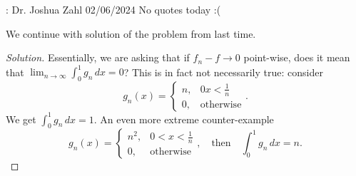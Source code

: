 \begin{nquote}{: Dr. Joshua Zahl 02/06/2024}
	No quotes today :(
\end{nquote}

We continue with solution of the problem from last time. 
\begin{proof}[Solution]
	Essentially, we are asking that if \(f_n-f\to 0\) point-wise, does it mean that \(\displaystyle\lim_{n\to\infty}\int_0^1 g_n \, dx=0\)? This is in fact not necessarily true: consider 
	\begin{equation*}
		g_n(x)=\begin{cases}
				n,&0x<\frac{1}{n}\\
				0,&\text{otherwise}
			   \end{cases}.
	\end{equation*}
	We get \(\displaystyle\int_0^1 g_n \, dx=1\). An even more extreme counter-example 
	\begin{equation*}
		g_n(x)=\begin{cases}
				n^2,&0<x<\frac{1}{n}\\
				0,&\text{otherwise}
			   \end{cases},\quad\text{then}\quad \int_0^1 g_n \, dx=n.
	\end{equation*}
\end{proof}

